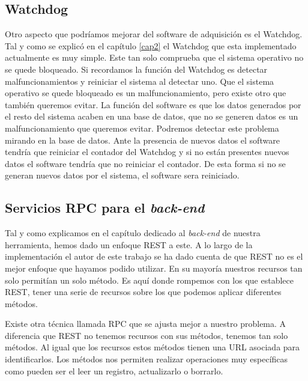 	\subsection{Watchdog}
	Otro aspecto que podríamos mejorar del software de adquisición es el Watchdog. Tal y como se explicó en el capítulo \ref{cap2} el Watchdog que esta
	implementado actualmente es muy simple. Este tan solo comprueba que el sistema operativo no se quede bloqueado. Si recordamos la función del
	Watchdog es detectar malfuncionamientos y reiniciar el sistema al detectar uno. Que el sistema operativo se quede bloqueado es un
	malfuncionamiento, pero existe otro que también queremos evitar. La función del software es que los datos generados por el resto del sistema
	acaben en una base de datos, que no se generen datos es un malfuncionamiento que queremos evitar. Podremos detectar este problema mirando en
	la base de datos. Ante la presencia de nuevos datos el software tendría que reiniciar el contador del Watchdog y si no están presentes nuevos
	datos el software tendría que no reiniciar el contador. De esta forma si no se generan nuevos datos por el sistema, el software sera
	reiniciado. 
	\subsection{Servicios RPC para el \emph{back-end}}
	Tal y como explicamos en el capítulo dedicado al \emph{back-end} de nuestra herramienta, hemos dado un enfoque REST\cite{Rest} a este.  A lo
	largo de la implementación el autor de este trabajo se ha dado cuenta de que REST no es el mejor enfoque que hayamos podido utilizar. En su
	mayoría nuestros recursos tan solo permitían un solo método. Es aquí donde rompemos con los que establece REST, tener una serie de recursos
	sobre los que podemos aplicar diferentes métodos. 
	\par
	Existe otra técnica llamada RPC que se ajusta mejor a nuestro problema. A diferencia que REST no tenemos recursos con sus métodos, tenemos tan
	solo métodos. Al igual que los recursos estos métodos tienen una URL asociada para identificarlos. Los métodos nos permiten realizar
	operaciones  muy específicas como pueden ser el leer un registro, actualizarlo o borrarlo.

